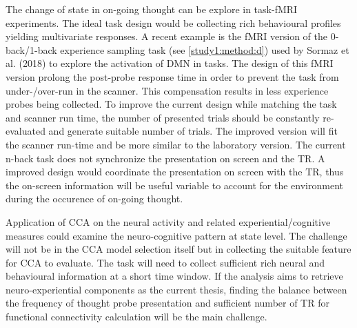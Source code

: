 The change of state in on-going thought can be explore in task-fMRI experiments. The ideal task design would be collecting rich behavioural profiles yielding multivariate responses. A recent example is the fMRI version of the 0-back/1-back experience sampling task (see \cref{study1:method:d}) used by Sormaz et al. (2018) to explore the activation of DMN in tasks. The design of this fMRI version prolong the post-probe response time in order to prevent the task from under-/over-run in the scanner. This compensation results in less experience probes being collected. To improve the current design while matching the task and scanner run time, the number of presented trials should be constantly re-evaluated and generate suitable number of trials. The improved version will fit the scanner run-time and be more similar to the laboratory version. The current n-back task does not synchronize the presentation on screen and the TR. A improved design would coordinate the presentation on screen with the TR, thus the on-screen information will be useful variable to account for the environment during the occurence of on-going thought.

Application of CCA on the neural activity and related experiential/cognitive measures could examine the neuro-cognitive pattern at state level. The challenge will not be in the CCA model selection itself but in collecting the suitable feature for CCA to evaluate. The task will need to collect sufficient rich neural and behavioural information at a short time window. If the analysis aims to retrieve neuro-experiential components as the current thesis, finding the balance between the frequency of thought probe presentation and sufficient number of TR for functional connectivity calculation will be the main challenge.


